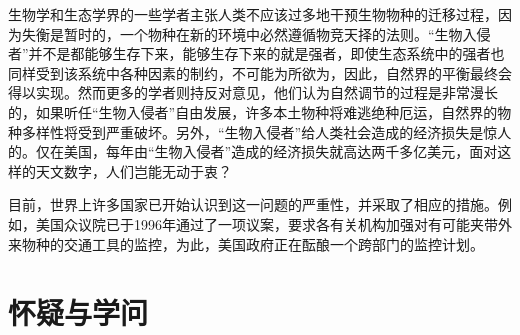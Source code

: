 \documentclass[12pt,UTF-8,openany]{ctexbook}
\begin{document}
\begin{normalsize}
    生物学和生态学界的一些学者主张人类不应该过多地干预生物物种的迁移过程，因为失衡是暂时的，一个物种在新的环境中必然遵循物竞天择的法则。“生物入侵者”并不是都能够生存下来，能够生存下来的就是强者，即使生态系统中的强者也同样受到该系统中各种因素的制约，不可能为所欲为，因此，自然界的平衡最终会得以实现。然而更多的学者则持反对意见，他们认为自然调节的过程是非常漫长的，如果听任“生物入侵者”自由发展，许多本土物种将难逃绝种厄运，自然界的物种多样性将受到严重破坏。另外，“生物入侵者”给人类社会造成的经济损失是惊人的。仅在美国，每年由“生物入侵者”造成的经济损失就高达两千多亿美元，面对这样的天文数字，人们岂能无动于衷？
    
    目前，世界上许多国家已开始认识到这一问题的严重性，并采取了相应的措施。例如，美国众议院已于1996年通过了一项议案，要求各有关机构加强对有可能夹带外来物种的交通工具的监控，为此，美国政府正在酝酿一个跨部门的监控计划。
    
\end{normalsize}



\chapter{怀疑与学问}
\end{document}
